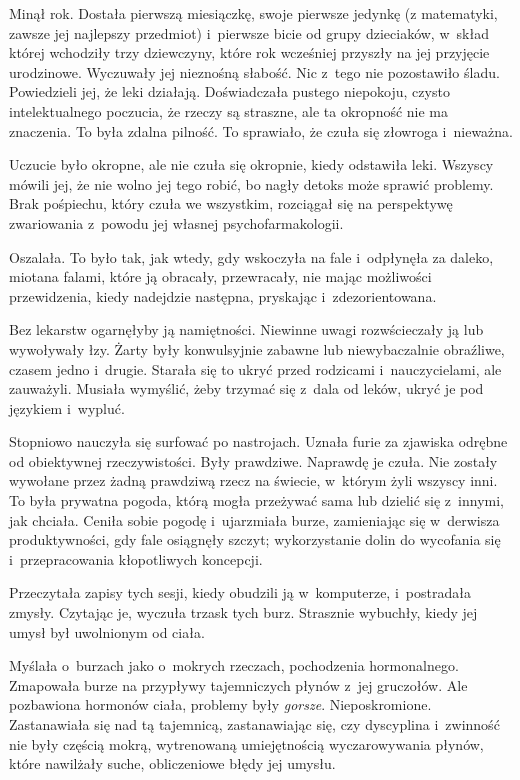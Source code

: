 \documentclass[oneside,polish,11pt,sfheadings]{mwbk}
\begin{document}
Minął rok. Dostała pierwszą miesiączkę, swoje pierwsze jedynkę (z
matematyki, zawsze jej najlepszy przedmiot) i~pierwsze bicie od grupy
dzieciaków, w~skład której wchodziły trzy dziewczyny, które rok
wcześniej przyszły na jej przyjęcie urodzinowe. Wyczuwały jej nieznośną
słabość. Nic z~tego nie pozostawiło śladu. Powiedzieli jej, że leki
działają. Doświadczała pustego niepokoju, czysto intelektualnego
poczucia, że rzeczy są straszne, ale ta okropność nie ma znaczenia. To
była zdalna pilność. To sprawiało, że czuła się złowroga i~nieważna.

Uczucie było okropne, ale nie czuła się okropnie, kiedy odstawiła leki.
Wszyscy mówili jej, że nie wolno jej tego robić, bo nagły detoks może
sprawić problemy. Brak pośpiechu, który czuła we wszystkim, rozciągał
się na perspektywę zwariowania z~powodu jej własnej psychofarmakologii.

Oszalała. To było tak, jak wtedy, gdy wskoczyła na fale i~odpłynęła za
daleko, miotana falami, które ją obracały, przewracały, nie mając
możliwości przewidzenia, kiedy nadejdzie następna, pryskając i~zdezorientowana.

Bez lekarstw ogarnęłyby ją namiętności. Niewinne uwagi rozwścieczały ją
lub wywoływały łzy. Żarty były konwulsyjnie zabawne lub niewybaczalnie
obraźliwe, czasem jedno i~drugie. Starała się to ukryć przed rodzicami i~nauczycielami, ale zauważyli. Musiała wymyślić, żeby trzymać się z~dala
od leków, ukryć je pod językiem i~wypluć.

Stopniowo nauczyła się surfować po nastrojach. Uznała furie za zjawiska
odrębne od obiektywnej rzeczywistości. Były prawdziwe. Naprawdę je
czuła. Nie zostały wywołane przez żadną prawdziwą rzecz na świecie, w~którym żyli wszyscy inni. To była prywatna pogoda, którą mogła przeżywać
sama lub dzielić się z~innymi, jak chciała. Ceniła sobie pogodę i~ujarzmiała burze, zamieniając się w~derwisza produktywności, gdy fale
osiągnęły szczyt; wykorzystanie dolin do wycofania się i~przepracowania
kłopotliwych koncepcji.

Przeczytała zapisy tych sesji, kiedy obudzili ją w~komputerze, i~postradała zmysły. Czytając je, wyczuła trzask tych burz. Strasznie
wybuchły, kiedy jej umysł był uwolnionym od ciała.

Myślała o~burzach jako o~mokrych rzeczach, pochodzenia hormonalnego.
Zmapowała burze na przypływy tajemniczych płynów z~jej gruczołów. Ale
pozbawiona hormonów ciała, problemy były \textit{gorsze}. Nieposkromione.
Zastanawiała się nad tą tajemnicą, zastanawiając się, czy dyscyplina i~zwinność nie były częścią mokrą, wytrenowaną umiejętnością
wyczarowywania płynów, które nawilżały suche, obliczeniowe błędy jej
umysłu.
\end{document}
